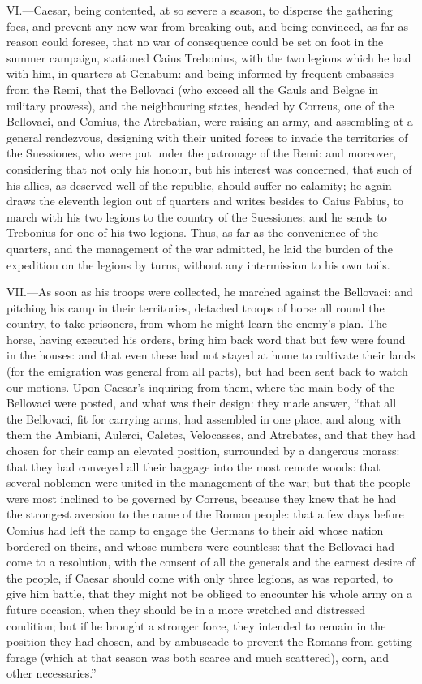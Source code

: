 VI.—Caesar, being contented, at so severe a season, to disperse the
gathering foes, and prevent any new war from breaking out, and being
convinced, as far as reason could foresee, that no war of consequence
could be set on foot in the summer campaign, stationed Caius Trebonius,
with the two legions which he had with him, in quarters at Genabum: and
being informed by frequent embassies from the Remi, that the Bellovaci
(who exceed all the Gauls and Belgae in military prowess), and the
neighbouring states, headed by Correus, one of the Bellovaci, and
Comius, the Atrebatian, were raising an army, and assembling at a
general rendezvous, designing with their united forces to invade the
territories of the Suessiones, who were put under the patronage of the
Remi: and moreover, considering that not only his honour, but his
interest was concerned, that such of his allies, as deserved well of the
republic, should suffer no calamity; he again draws the eleventh legion
out of quarters and writes besides to Caius Fabius, to march with his
two legions to the country of the Suessiones; and he sends to Trebonius
for one of his two legions. Thus, as far as the convenience of the
quarters, and the management of the war admitted, he laid the burden of
the expedition on the legions by turns, without any intermission to his
own toils.

VII.—As soon as his troops were collected, he marched against the
Bellovaci: and pitching his camp in their territories, detached troops
of horse all round the country, to take prisoners, from whom he might
learn the enemy's plan. The horse, having executed his orders, bring him
back word that but few were found in the houses: and that even these had
not stayed at home to cultivate their lands (for the emigration was
general from all parts), but had been sent back to watch our motions.
Upon Caesar's inquiring from them, where the main body of the Bellovaci
were posted, and what was their design: they made answer, ``that all the
Bellovaci, fit for carrying arms, had assembled in one place, and along
with them the Ambiani, Aulerci, Caletes, Velocasses, and Atrebates, and
that they had chosen for their camp an elevated position, surrounded by
a dangerous morass: that they had conveyed all their baggage into the
most remote woods: that several noblemen were united in the management
of the war; but that the people were most inclined to be governed by
Correus, because they knew that he had the strongest aversion to the
name of the Roman people: that a few days before Comius had left the
camp to engage the Germans to their aid whose nation bordered on theirs,
and whose numbers were countless: that the Bellovaci had come to a
resolution, with the consent of all the generals and the earnest desire
of the people, if Caesar should come with only three legions, as was
reported, to give him battle, that they might not be obliged to
encounter his whole army on a future occasion, when they should be in a
more wretched and distressed condition; but if he brought a stronger
force, they intended to remain in the position they had chosen, and by
ambuscade to prevent the Romans from getting forage (which at that
season was both scarce and much scattered), corn, and other
necessaries.''

